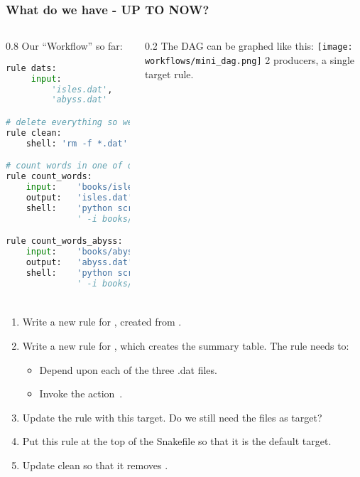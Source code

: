 \begin{frame}[fragile]
  \frametitle{What do we have - UP TO NOW?}
  \begin{columns}
   \begin{column}{0.8\textwidth}
     Our ``Workflow'' so far:
     \begin{lstlisting}[language=Python,style=Python, basicstyle=\tiny]
rule dats:
     input:
         'isles.dat',
         'abyss.dat'

# delete everything so we can re-run things
rule clean:
    shell: 'rm -f *.dat'

# count words in one of our "books"
rule count_words:
    input:    'books/isles.txt'
    output:   'isles.dat'
    shell:    'python scripts/wordcount.py'
              ' -i books/isles.txt -o isles.dat'

rule count_words_abyss:
    input:    'books/abyss.txt'
    output:   'abyss.dat'
    shell:    'python scripts/wordcount.py' 
              ' -i books/abyss.txt -o abyss.dat'     
     \end{lstlisting}

   \end{column}
   
   \begin{column}{0.2\textwidth}
     The DAG can be graphed like this:
     \texttt{[image: workflows/mini\_dag.png]}
     2 producers, a single target rule.
   \end{column}
  \end{columns}
\end{frame}

\begin{frame}[fragile]
  \frametitle{}
  \begin{enumerate}
   \item Write a new rule for , created from .
   \item Write a new rule for , which creates the summary table. The rule needs to:
        \begin{itemize}
         \item Depend upon each of the three .dat files.
         \item Invoke the action \,.
        \end{itemize}
   \item Update the  rule with this target. Do we still need the  files as target?
   \item Put this rule at the top of the Snakefile so that it is the default target.
   \item Update clean so that it removes .
  \end{enumerate}
\end{frame}


